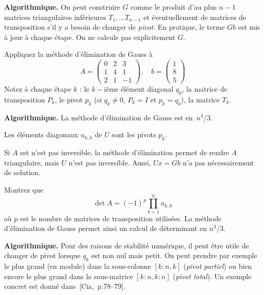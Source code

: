 {\bf Algorithmique.}
On peut construire $G$ comme le produit d'au plus $n-1$ matrices triangulaires inférieures $T_1,\dots T_{n-1}$ et éventuellement de matrices de transposition s'il y a besoin de changer de \emph{pivot}. En pratique, le terme $Gb$ est mis à jour à chaque étape. On ne calcule pas explicitement $G$.

\begin{exercice}
Appliquez la méthode d'élimination de Gauss à
\[
A = \left(\begin{array}{ccc}
0 & 2 & 3 \\
1 & 4 & 1  \\
2 & 1 & -1
\end{array}\right), \quad b = \begin{pmatrix}1 \\ 8 \\5\end{pmatrix}
\]
Notez à chaque étape $k$ : le $k-$ième élément diagonal $q_k$, la matrice de
transposition $P_k$, le pivot $p_k$ (si $q_k \neq 0$, $P_k = I$ et $p_k =
q_k$), la matrice $T_k$.
\end{exercice}

{\bf Algorithmique.}
La méthode d'élimination de Gauss est en~$\displaystyle {n^3}/{3}$.

\begin{remark}
Les éléments diagonaux $u_{k,k}$ de $U$ sont les pivots $p_k$.
\end{remark}

\begin{remark}
Si $A$ est n'est pas inversible, la méthode d'élimination permet de rendre
$A$ triangulaire, mais $U$ n'est pas inversible. Aussi, $Ux = Gb$ n'a pas
nécessairement de solution.
\end{remark}

\begin{exercice}
Montrez que
\[
\det A = (-1)^p \prod_{k=1}^n u_{k,k}
\]
où $p$ est le nombre de matrices de transposition utilisées. La méthode
d'élimination de Gauss permet ainsi un calcul de déterminant en
$\displaystyle {n^3}/{3}$.
\end{exercice}

{\bf Algorithmique.}
Pour des raisons de stabilité numérique, il peut être utile de changer de
pivot lorsque $q_k$ est non nul mais petit. On peut prendre par exemple le
plus grand (en module) dans la sous-colonne $[k:n,k]$ (\emph{pivot partiel})
ou bien encore le plus grand dans la sous-matrice $[k:n,k:n]$ (\emph{pivot
total}). Un exemple concret est donné dans~[Cia,~p.78--79].

